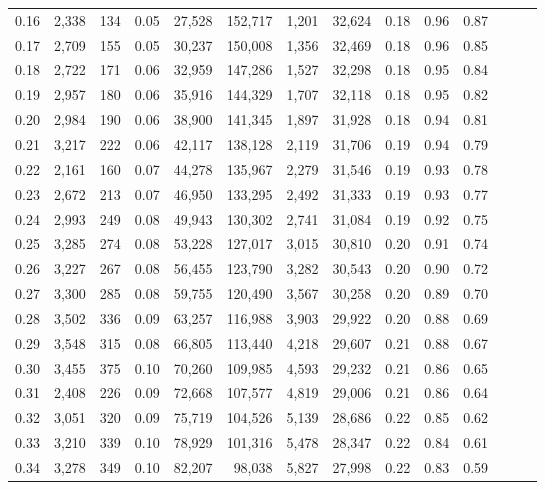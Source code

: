 \begin{tabular}{rrrrrrrrrrrrrr}
0.16 &  2,338 &  134 &  0.05 &   27,528 &  152,717 &   1,201 &  32,624 &  0.18 &  0.96 &      0.87 \\
0.17 &  2,709 &  155 &  0.05 &   30,237 &  150,008 &   1,356 &  32,469 &  0.18 &  0.96 &      0.85 \\
0.18 &  2,722 &  171 &  0.06 &   32,959 &  147,286 &   1,527 &  32,298 &  0.18 &  0.95 &      0.84 \\
0.19 &  2,957 &  180 &  0.06 &   35,916 &  144,329 &   1,707 &  32,118 &  0.18 &  0.95 &      0.82 \\
0.20 &  2,984 &  190 &  0.06 &   38,900 &  141,345 &   1,897 &  31,928 &  0.18 &  0.94 &      0.81 \\
0.21 &  3,217 &  222 &  0.06 &   42,117 &  138,128 &   2,119 &  31,706 &  0.19 &  0.94 &      0.79 \\
0.22 &  2,161 &  160 &  0.07 &   44,278 &  135,967 &   2,279 &  31,546 &  0.19 &  0.93 &      0.78 \\
0.23 &  2,672 &  213 &  0.07 &   46,950 &  133,295 &   2,492 &  31,333 &  0.19 &  0.93 &      0.77 \\
0.24 &  2,993 &  249 &  0.08 &   49,943 &  130,302 &   2,741 &  31,084 &  0.19 &  0.92 &      0.75 \\
0.25 &  3,285 &  274 &  0.08 &   53,228 &  127,017 &   3,015 &  30,810 &  0.20 &  0.91 &      0.74 \\
0.26 &  3,227 &  267 &  0.08 &   56,455 &  123,790 &   3,282 &  30,543 &  0.20 &  0.90 &      0.72 \\
0.27 &  3,300 &  285 &  0.08 &   59,755 &  120,490 &   3,567 &  30,258 &  0.20 &  0.89 &      0.70 \\
0.28 &  3,502 &  336 &  0.09 &   63,257 &  116,988 &   3,903 &  29,922 &  0.20 &  0.88 &      0.69 \\
0.29 &  3,548 &  315 &  0.08 &   66,805 &  113,440 &   4,218 &  29,607 &  0.21 &  0.88 &      0.67 \\
0.30 &  3,455 &  375 &  0.10 &   70,260 &  109,985 &   4,593 &  29,232 &  0.21 &  0.86 &      0.65 \\
0.31 &  2,408 &  226 &  0.09 &   72,668 &  107,577 &   4,819 &  29,006 &  0.21 &  0.86 &      0.64 \\
0.32 &  3,051 &  320 &  0.09 &   75,719 &  104,526 &   5,139 &  28,686 &  0.22 &  0.85 &      0.62 \\
0.33 &  3,210 &  339 &  0.10 &   78,929 &  101,316 &   5,478 &  28,347 &  0.22 &  0.84 &      0.61 \\
0.34 &  3,278 &  349 &  0.10 &   82,207 &   98,038 &   5,827 &  27,998 &  0.22 &  0.83 &      0.59 \\

\end{tabular}
